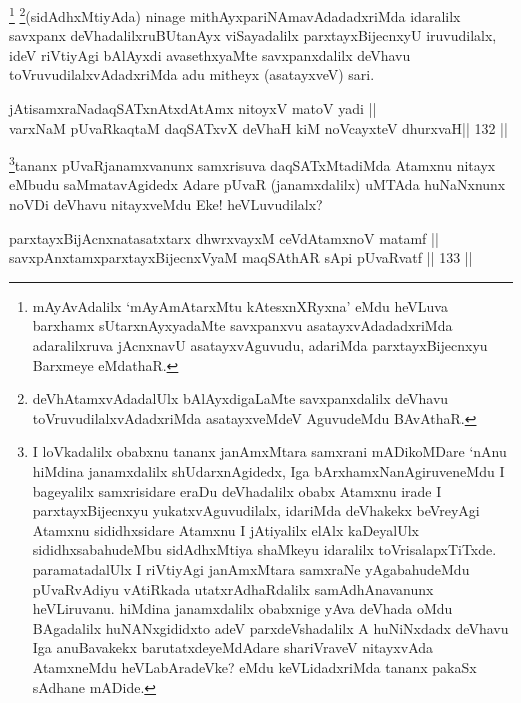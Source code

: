 \begin{artha}
\footnote{mAyAvAdalilx `mAyAmAtarxMtu kAtesxnXRyxna' eMdu heVLuva barxhamx sUtarxnAyxyadaMte savxpanxvu asatayxvAdadadxriMda adaralilxruva jAcnxnavU asatayxvAguvudu, adariMda parxtayxBijecnxyu Barxmeye eMdathaR.}
\footnote{deVhAtamxvAdadalUlx bAlAyxdigaLaMte savxpanxdalilx deVhavu toVruvudilalxvAdadxriMda asatayxveMdeV AguvudeMdu BAvAthaR.}(sidAdhxMtiyAda) ninage mithAyxpariNAmavAdadadxriMda idaralilx savxpanx deVhadalilxruBUtanAyx viSayadalilx parxtayxBijecnxyU iruvudilalx, ideV riVtiyAgi bAlAyxdi avasethxyaMte savxpanxdalilx deVhavu toVruvudilalxvAdadxriMda adu mitheyx (asatayxveV) sari.
\end{artha}


\begin{shl}
jAtisamxraNadaqSATxnAtxdAtAmx nitoyxV matoV yadi ||  \\
varxNaM pUvaRkaqtaM daqSATxvX deVhaH kiM noVcayxteV dhurxvaH\hfill ||  132 ||  
\end{shl}

\begin{artha}
\footnote[3]{I loVkadalilx obabxnu tananx janAmxMtara samxrani mADikoMDare `nAnu hiMdina janamxdalilx shUdarxnAgidedx, Iga bArxhamxNanAgiruveneMdu I bageyalilx samxrisidare eraDu deVhadalilx obabx Atamxnu irade I parxtayxBijecnxyu yukatxvAguvudilalx, idariMda deVhakekx beVreyAgi Atamxnu sididhxsidare Atamxnu I jAtiyalilx elAlx kaDeyalUlx sididhxsabahudeMbu sidAdhxMtiya shaMkeyu idaralilx toVrisalapxTiTxde. paramatadalUlx I riVtiyAgi janAmxMtara samxraNe yAgabahudeMdu pUvaRvAdiyu vAtiRkada utatxrAdhaRdalilx samAdhAnavanunx heVLiruvanu. hiMdina janamxdalilx obabxnige yAva deVhada oMdu BAgadalilx huNANxgididxto adeV parxdeVshadalilx A huNiNxdadx deVhavu Iga anuBavakekx barutatxdeyeMdAdare shariVraveV nitayxvAda AtamxneMdu heVLabAradeVke? eMdu keVLidadxriMda tananx pakaSx sAdhane mADide.}tananx pUvaRjanamxvanunx samxrisuva daqSATxMtadiMda Atamxnu nitayx eMbudu saMmatavAgidedx Adare pUvaR (janamxdalilx) uMTAda huNaNxnunx noVDi deVhavu nitayxveMdu Eke! heVLuvudilalx?
\end{artha}

\begin{shl}
parxtayxBijAcnxnatasatxtarx dhwrxvayxM ceVdAtamxnoV matamf ||  \\
savxpAnxtamxparxtayxBijecnxVyaM maqSAthAR sA\s pi pUvaRvatf \hfill||  133 ||  
\end{shl}
				
